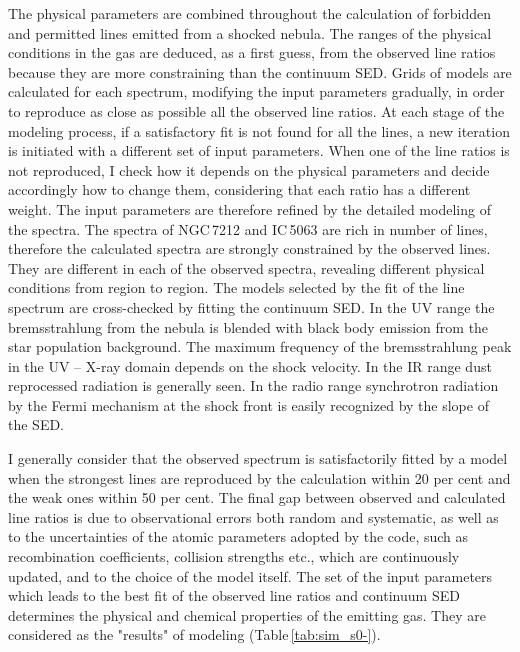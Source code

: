 \documentclass[../main.tex]{subfiles}
\begin{document}
The physical parameters are combined throughout the calculation of forbidden and permitted lines emitted from a shocked nebula.
The ranges of the physical conditions in the gas are deduced, as a first guess, from the observed line ratios because they are more constraining than the continuum SED.
Grids of models are calculated for each spectrum, modifying the input parameters gradually, in order to reproduce as close as possible all the observed line ratios.
At each stage of the modeling process, if a satisfactory fit is not found for all the lines, a new iteration is initiated with a different set of input parameters. 
When one of the line ratios is not reproduced, I check how it depends on the physical parameters and decide accordingly how to change them, considering that each ratio has a different weight.
The input parameters are therefore refined by the detailed modeling of the spectra.
The spectra of NGC\,7212 and IC\,5063 are rich in number of lines, therefore the calculated spectra are strongly constrained by the observed lines. 
They are different in each of the observed spectra, revealing different physical conditions from region to region. 
The models selected  by the fit of the line spectrum  are cross-checked by fitting the continuum SED.
In the UV range the bremsstrahlung from the  nebula is blended with black body emission from the star population background. 
The maximum frequency of the bremsstrahlung peak in the UV -- X-ray domain depends on the shock velocity. 
In the IR range dust reprocessed radiation is generally seen.  
In the radio range synchrotron radiation by the Fermi mechanism at the shock front is easily recognized by the slope of the SED.


I generally consider that the observed spectrum is satisfactorily fitted by a model when the strongest lines are
reproduced by the calculation within 20 per cent and the weak ones within 50 per cent.
The final gap between observed and calculated line ratios is due to observational errors both random and systematic, as well as to the uncertainties of the atomic parameters  adopted by the code, such as recombination coefficients, collision strengths etc., which are continuously updated, and to the choice of the model itself.
The set of the input parameters which leads to the best fit of the observed line ratios and continuum SED determines the physical and chemical properties of the emitting gas. 
They are considered as the "results" of modeling (Table\,\ref{tab:sim_s0-}). 
\end{document}
